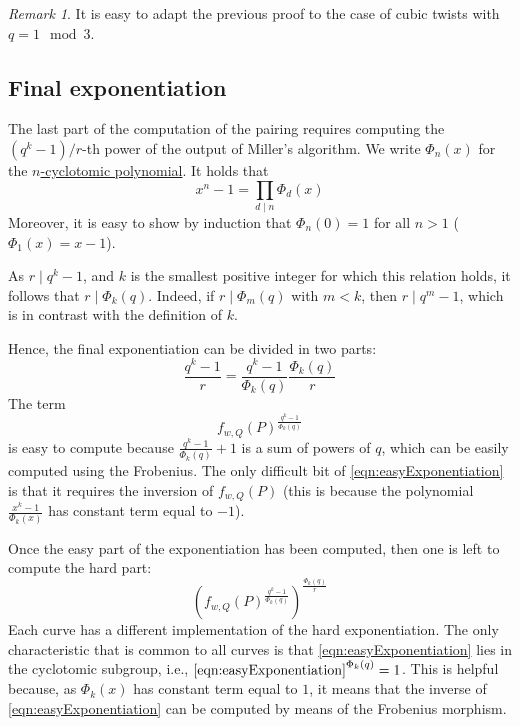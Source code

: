 \documentclass{article}
\theoremstyle{remark}
\newtheorem{remark}{Remark}[section]
\theoremstyle{plain}
\begin{document}
\begin{remark}
    It is easy to adapt the previous proof to the case of cubic twists with $q = 1 \mod 3$.
\end{remark}

\subsection{Final exponentiation}
\label{subsect:finalexponentiation}

The last part of the computation of the pairing requires computing the $(q^k - 1)/r$-th power of the output of Miller's algorithm.
We write $\Phi_n(x)$ for the \href{https://en.wikipedia.org/wiki/Cyclotomic_polynomial}{$n$-cyclotomic polynomial}.
It holds that
\[
    x^n - 1 = \prod_{d \mid n} \Phi_d(x)
\]
Moreover, it is easy to show by induction that $\Phi_n(0) = 1$ for all $n > 1$ ($\Phi_1(x) = x - 1$).

As $r \mid q^k - 1$, and $k$ is the smallest positive integer for which this relation holds, it follows that $r \mid \Phi_k(q)$.
Indeed, if $r \mid \Phi_m(q)$ with $m < k$, then $r \mid q^m - 1$, which is in contrast with the definition of $k$.

Hence, the final exponentiation can be divided in two parts:
\[
    \frac{q^k-1}{r} = \frac{q^k-1}{\Phi_k(q)} \frac{\Phi_k(q)}{r}
\]
The term
\begin{equation}
    \label{eqn:easyExponentiation}
    f_{w,Q}(P)^{\frac{q^k-1}{\Phi_k(q)}}
\end{equation}
is easy to compute because $\frac{q^k-1}{\Phi_k(q)} + 1$ is a sum of powers of $q$, which can be easily computed using the Frobenius.
The only difficult bit of \eqref{eqn:easyExponentiation} is that it requires the inversion of $f_{w,Q}(P)$ (this is because the polynomial $\frac{x^k-1}{\Phi_k(x)}$ has constant term equal to $-1$).

Once the easy part of the exponentiation has been computed, then one is left to compute the hard part:
\[
    \left( f_{w,Q}(P)^{\frac{q^k-1}{\Phi_k(q)}} \right)^{\frac{\Phi_k(q)}{r}}
\]
Each curve has a different implementation of the hard exponentiation.
The only characteristic that is common to all curves is that \eqref{eqn:easyExponentiation} lies in the cyclotomic subgroup, i.e., $\eqref{eqn:easyExponentiation}^{\Phi_k(q)} = 1$.
This is helpful because, as $\Phi_k(x)$ has constant term equal to $1$, it means that the inverse of \eqref{eqn:easyExponentiation} can be computed by means of the Frobenius morphism.
\end{document}
